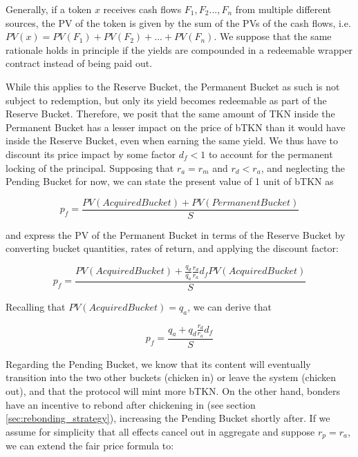 \documentclass{article}
\begin{document}
Generally, if a token $x$ receives cash flows $F_1, F_2..., F_n$ from multiple different sources, the PV of the token is given by the sum of the PVs of the cash flows, i.e. $PV(x) = PV(F_1) + PV(F_2) + ... + PV(F_n)$. We suppose that the same rationale holds in principle if the yields are compounded in a redeemable wrapper contract instead of being paid out. 

While this applies to the Reserve Bucket, the Permanent Bucket as such is not subject to redemption, but only its yield becomes redeemable as part of the Reserve Bucket. Therefore, we posit that the same amount of TKN inside the Permanent Bucket has a lesser impact on the price of bTKN than it would have inside the Reserve Bucket, even when earning the same yield. We thus have to discount its price impact by some factor $d_f < 1$ to account for the permanent locking of the principal. Supposing that $r_a = r_m$ and $r_d < r_a$, and neglecting the Pending Bucket for now, we can state the present value of 1 unit of bTKN as

\begin{equation}
  \label{eq:naive-1}
    p_f = \frac{PV(AcquiredBucket) + PV(PermanentBucket)}{S}
\end{equation}

and express the PV of the Permanent Bucket in terms of the Reserve Bucket by converting bucket quantities, rates of return, and applying the discount factor:

\begin{equation}
  \label{eq:naive-2}
   p_f = \frac{PV(AcquiredBucket) + \frac{q_d}{q_a} \frac{r_d}{r_a} d_f PV(AcquiredBucket)}{S}
\end{equation}

Recalling that $PV(AcquiredBucket) = q_a$, we can derive that

\begin{equation}
  \label{eq:naive-3}
   p_f = \frac{q_a + q_d \frac{r_d}{r_a} d_f}{S}
\end{equation}

Regarding the Pending Bucket, we know that its content will eventually transition into the two other buckets (chicken in) or leave the system (chicken out), and that the protocol will mint more bTKN. On the other hand, bonders have an incentive to rebond after chickening in (see section \ref{sec:rebonding_strategy}), increasing the Pending Bucket shortly after. If we assume for simplicity that all effects cancel out in aggregate and suppose $r_p = r_a$, we can extend the fair price formula to:
\end{document}
